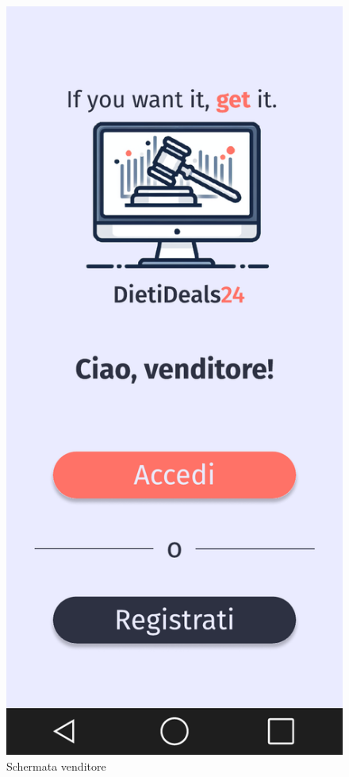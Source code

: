 \begin{figure}[!htb]
\begin{minipage}{0.32\textwidth}
            \includegraphics[width=.7\linewidth]{Immagini/Frames/1.pdf}
            \caption{Schermata venditore}
        \end{minipage}\hfill
        \begin{minipage}{0.32\textwidth}
            \centering

\end{minipage}
\end{figure}
